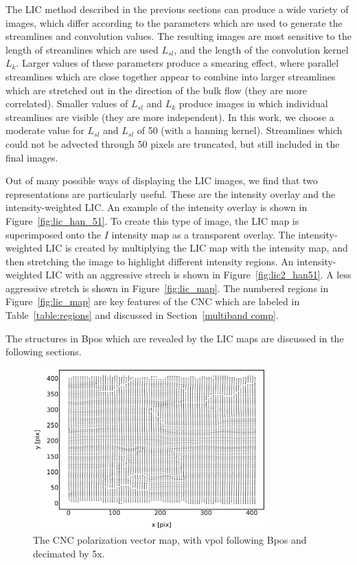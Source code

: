 The LIC method described in the previous sections can produce a wide variety of images, which differ according to the parameters which are used to generate the streamlines and convolution values. The resulting images are most sensitive to the length of streamlines which are used $L_{sl}$, and the length of the convolution kernel $L_{k}$. Larger values of these parameters produce a smearing effect, where parallel streamlines which are close together appear to combine into larger streamlines which are stretched out in the direction of the bulk flow (they are more correlated). Smaller values of $L_{sl}$ and $L_{k}$ produce images in which individual streamlines are visible (they are more independent). In this work, we choose a moderate value for $L_{sl}$ and $L_{sl}$ of 50 (with a hanning kernel). Streamlines which could not be advected through 50 pixels are truncated, but still included in the final images.

Out of many possible ways of displaying the LIC images, we find that two representations are particularly useful. These are the intensity overlay and the intensity-weighted LIC. An example of the intensity overlay is shown in Figure~\ref{fig:lic_han_51}. To create this type of image, the LIC map is superimposed onto the $I$ intensity map as a transparent overlay. The intensity-weighted LIC is created by multiplying the LIC map with the intensity map, and then stretching the image to highlight different intensity regions. An intensity-weighted LIC with an aggressive strech is shown in Figure~\ref{fig:lic2_han51}. A less aggressive stretch is shown in Figure~\ref{fig:lic_map}. The numbered regions in Figure~\ref{fig:lic_map} are key features of the CNC which are labeled in Table~\ref{table:regions} and discussed in Section~\ref{multiband comp}.

The structures in \gls{Bpos} which are revealed by the LIC maps are discussed in the following sections.

\begin{figure}[!htbp]
\centering
\includegraphics[width=0.8\textwidth]{figures/carina/vectors_5}
\caption[~The CNC polarization vector map, decimated by 5x.]{The CNC polarization vector map, with \gls{vpol} following \gls{Bpos} and decimated by 5x.}
\label{fig:vectors_5}
\end{figure}

